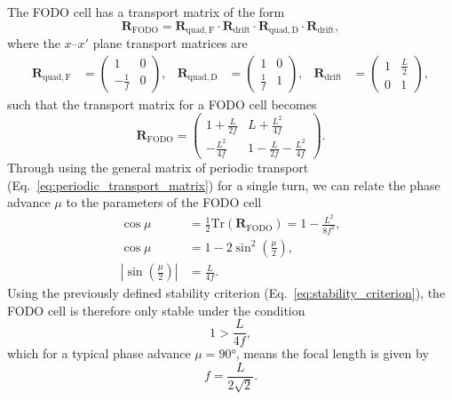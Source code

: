 \documentclass[../main.tex]{subfiles}
\begin{document}
The FODO cell has a transport matrix of the form
\begin{equation}
\boldsymbol{R}_{\mathrm{FODO}} = \boldsymbol{R}_{\mathrm{quad,F}}\cdot\boldsymbol{R}_{\mathrm{drift}}\cdot\boldsymbol{R}_{\mathrm{quad,D}}\cdot\boldsymbol{R}_{\mathrm{drift}},
\label{eq:FODO_transport}    
\end{equation}
where the $x$--$x'$ plane transport matrices are
\begin{align}
\boldsymbol{R}_{\mathrm{quad,F}} &= 
\begin{pmatrix}
1 & 0 \\
-\frac{1}{f} & 0
\end{pmatrix}, & \boldsymbol{R}_{\mathrm{quad,D}} &= 
\begin{pmatrix}
1 & 0 \\
\frac{1}{f} & 1
\end{pmatrix}, & \boldsymbol{R}_{\mathrm{drift}} &= 
\begin{pmatrix}
1 & \frac{L}{2} \\
0 & 1
\end{pmatrix},
\label{eq:FODO_component_matrices}    
\end{align}
such that the transport matrix for a FODO cell becomes
\begin{equation}
\boldsymbol{R}_{\mathrm{FODO}} =
\begin{pmatrix}
1+\frac{L}{2f} & L+\frac{L^{2}}{4f} \\
-\frac{L^{2}}{4f} & 1-\frac{L}{2f}-\frac{L^{2}}{4f}
\end{pmatrix}.
\label{eq:FODO_matrix}
\end{equation}
Through using the general matrix of periodic transport (Eq.~\ref{eq:periodic_transport_matrix}) for a single turn, we can relate the phase advance $\mu$ to the parameters of the FODO cell
\begin{align}
\cos\mu &= \frac{1}{2}\boldsymbol{\mathrm{Tr}}\left(\boldsymbol{R}_{\mathrm{FODO}}\right) = 1-\frac{L^{2}}{8f^{2}}, \\
\cos\mu &= 1-2\sin^{2}\left(\frac{\mu}{2}\right), \\
\left|\sin\left(\frac{\mu}{2}\right)\right| &= \frac{L}{4f}.
\label{eq:phase_advance_FODO}
\end{align}
Using the previously defined stability criterion (Eq.~\ref{eq:stability_criterion}), the FODO cell is therefore only stable under the condition
\begin{equation}
1>\frac{L}{4f},
\label{eq:FODO_stability}    
\end{equation}
which for a typical phase advance $\mu=90$\si{\degree}, means the focal length is given by
\begin{equation}
f=\frac{L}{2\sqrt{2}}.
\label{eq:FODO_focal_90}    
\end{equation}
\end{document}
